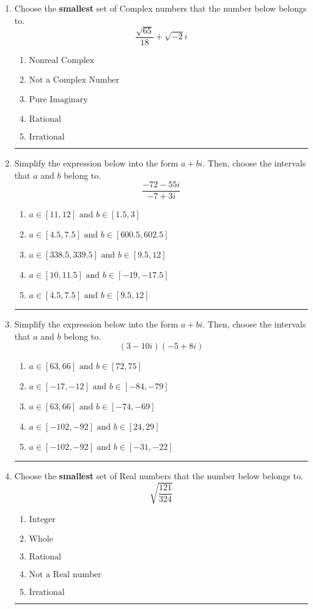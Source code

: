 \documentclass[14pt]{extbook}
\newcommand{\litem}[1]{\item#1\hspace*{-1cm}\rule{\textwidth}{0.4pt}}
\begin{document}
\begin{enumerate}
{\begin{enumerate}[label=\Alph*.]
\end{enumerate} }
\litem{
Choose the \textbf{smallest} set of Complex numbers that the number below belongs to.\[ \frac{\sqrt{65}}{18}+\sqrt{-2}i \]\begin{enumerate}[label=\Alph*.]
\item \( \text{Nonreal Complex} \)
\item \( \text{Not a Complex Number} \)
\item \( \text{Pure Imaginary} \)
\item \( \text{Rational} \)
\item \( \text{Irrational} \)

\end{enumerate} }
\litem{
Simplify the expression below into the form $a+bi$. Then, choose the intervals that $a$ and $b$ belong to.\[ \frac{-72 - 55 i}{-7 + 3 i} \]\begin{enumerate}[label=\Alph*.]
\item \( a \in [11, 12] \text{ and } b \in [1.5, 3] \)
\item \( a \in [4.5, 7.5] \text{ and } b \in [600.5, 602.5] \)
\item \( a \in [338.5, 339.5] \text{ and } b \in [9.5, 12] \)
\item \( a \in [10, 11.5] \text{ and } b \in [-19, -17.5] \)
\item \( a \in [4.5, 7.5] \text{ and } b \in [9.5, 12] \)

\end{enumerate} }
\litem{
Simplify the expression below into the form $a+bi$. Then, choose the intervals that $a$ and $b$ belong to.\[ (3 - 10 i)(-5 + 8 i) \]\begin{enumerate}[label=\Alph*.]
\item \( a \in [63, 66] \text{ and } b \in [72, 75] \)
\item \( a \in [-17, -12] \text{ and } b \in [-84, -79] \)
\item \( a \in [63, 66] \text{ and } b \in [-74, -69] \)
\item \( a \in [-102, -92] \text{ and } b \in [24, 29] \)
\item \( a \in [-102, -92] \text{ and } b \in [-31, -22] \)

\end{enumerate} }
\litem{
Choose the \textbf{smallest} set of Real numbers that the number below belongs to.\[ \sqrt{\frac{121}{324}} \]\begin{enumerate}[label=\Alph*.]
\item \( \text{Integer} \)
\item \( \text{Whole} \)
\item \( \text{Rational} \)
\item \( \text{Not a Real number} \)
\item \( \text{Irrational} \)


\end{enumerate}}
\end{enumerate}
\end{document}

